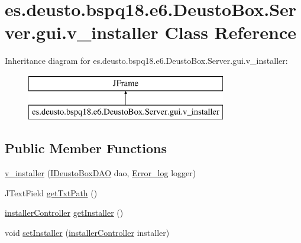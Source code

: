 \hypertarget{classes_1_1deusto_1_1bspq18_1_1e6_1_1_deusto_box_1_1_server_1_1gui_1_1v__installer}{}\section{es.\+deusto.\+bspq18.\+e6.\+Deusto\+Box.\+Server.\+gui.\+v\+\_\+installer Class Reference}
\label{classes_1_1deusto_1_1bspq18_1_1e6_1_1_deusto_box_1_1_server_1_1gui_1_1v__installer}
Inheritance diagram for es.\+deusto.\+bspq18.\+e6.\+Deusto\+Box.\+Server.\+gui.\+v\+\_\+installer\+:\begin{figure}[H]
\begin{center}
\leavevmode
\includegraphics[height=2.000000cm]{classes_1_1deusto_1_1bspq18_1_1e6_1_1_deusto_box_1_1_server_1_1gui_1_1v__installer}
\end{center}
\end{figure}
\subsection*{Public Member Functions}
\begin{DoxyCompactItemize}
\item 
\mbox{\hyperlink{classes_1_1deusto_1_1bspq18_1_1e6_1_1_deusto_box_1_1_server_1_1gui_1_1v__installer_a0ba5541497667a9a3d516a59d2000b83}{v\+\_\+installer}} (\mbox{\hyperlink{interfacees_1_1deusto_1_1bspq18_1_1e6_1_1_deusto_box_1_1_server_1_1jdo_1_1dao_1_1_i_deusto_box_d_a_o}{I\+Deusto\+Box\+D\+AO}} dao, \mbox{\hyperlink{classes_1_1deusto_1_1bspq18_1_1e6_1_1_deusto_box_1_1_server_1_1utils_1_1_error__log}{Error\+\_\+log}} logger)
\item 
J\+Text\+Field \mbox{\hyperlink{classes_1_1deusto_1_1bspq18_1_1e6_1_1_deusto_box_1_1_server_1_1gui_1_1v__installer_a5ec6edb5ef2def9839d072baebccf23f}{get\+Txt\+Path}} ()
\item 
\mbox{\hyperlink{classes_1_1deusto_1_1bspq18_1_1e6_1_1_deusto_box_1_1_server_1_1gui_1_1installer_controller}{installer\+Controller}} \mbox{\hyperlink{classes_1_1deusto_1_1bspq18_1_1e6_1_1_deusto_box_1_1_server_1_1gui_1_1v__installer_a54601c01555a191f32f6c1a1c27aa95c}{get\+Installer}} ()
\item 
void \mbox{\hyperlink{classes_1_1deusto_1_1bspq18_1_1e6_1_1_deusto_box_1_1_server_1_1gui_1_1v__installer_a97379a2b34e46c84867f52b77ef016f7}{set\+Installer}} (\mbox{\hyperlink{classes_1_1deusto_1_1bspq18_1_1e6_1_1_deusto_box_1_1_server_1_1gui_1_1installer_controller}{installer\+Controller}} installer)
\end{DoxyCompactItemize}
